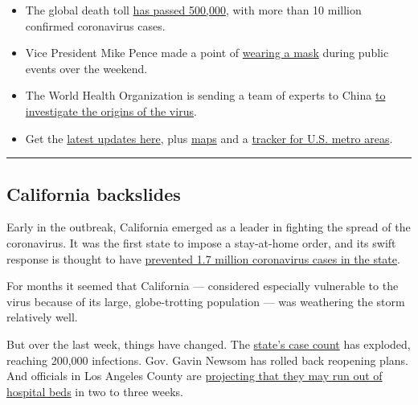 \begin{itemize}
\item
  The global death toll
  \href{https://www.nytimes.com/2020/06/28/world/coronavirus-updates.html\#link-31665a4b}{has
  passed 500,000}, with more than 10 million confirmed coronavirus
  cases.
\item
  Vice President Mike Pence made a point of
  \href{https://www.nytimes.com/2020/06/29/world/coronavirus-updates.html\#link-56ea353b}{wearing
  a mask} during public events over the weekend.
\item
  The World Health Organization is sending a team of experts to China
  \href{https://www.nytimes.com/2020/06/29/world/coronavirus-live-updates.html\#link-9c42599}{to
  investigate the origins of the virus}.
\item
  Get the \href{https://www.nytimes.com/news-event/coronavirus}{latest
  updates here}, plus
  \href{https://www.nytimes.com/interactive/2020/world/asia/china-wuhan-coronavirus-maps.html?action=click\&pgtype=Article\&state=default\&module=styln-coronavirus\&variant=show\&region=TOP_BANNER\&context=storyline_menu}{maps}
  and a
  \href{https://www.nytimes.com/interactive/2020/04/03/upshot/coronavirus-metro-area-tracker.html}{tracker
  for U.S. metro areas}.
\end{itemize}

\begin{center}\rule{0.5\linewidth}{\linethickness}\end{center}

\hypertarget{california-backslides}{%
\subsection{California backslides}\label{california-backslides}}

Early in the outbreak, California emerged as a leader in fighting the
spread of the coronavirus. It was the first state to impose a
stay-at-home order, and its swift response is thought to have
\href{https://www.sfchronicle.com/bayarea/article/Study-Shelter-in-place-helped-avert-4-8-million-15325645.php}{prevented
1.7 million coronavirus cases in the state}.

For months it seemed that California --- considered especially
vulnerable to the virus because of its large, globe-trotting population
--- was weathering the storm relatively well.

But over the last week, things have changed. The
\href{https://www.nytimes.com/interactive/2020/us/california-coronavirus-cases.html}{state's
case count} has exploded, reaching 200,000 infections. Gov. Gavin Newsom
has rolled back reopening plans. And officials in Los Angeles County are
\href{https://www.latimes.com/california/story/2020-06-29/l-a-county-issues-dire-warning-amid-alarming-increases-in-coronavirus}{projecting
that they may run out of hospital beds} in two to three weeks.

